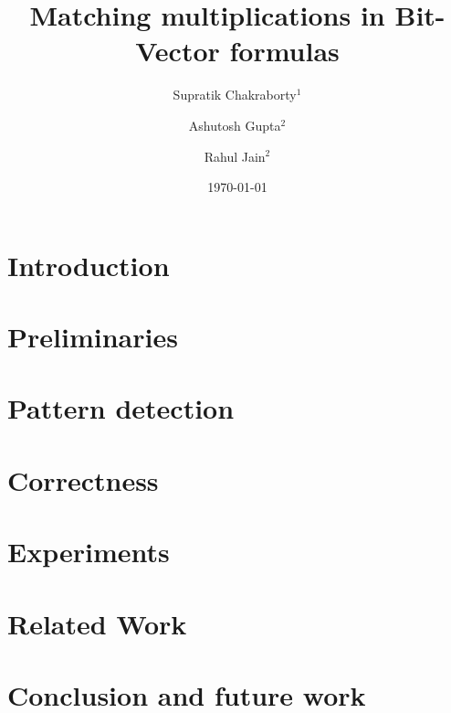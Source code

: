 \documentclass[draft]{llncs}
\begin{document}
\title{Matching multiplications in Bit-Vector formulas}

\author{Supratik Chakraborty$^1$ \and Ashutosh Gupta$^2$ \and Rahul Jain$^2$}


\date{\today}

\maketitle
\begin{abstract}

\end{abstract}

\section{Introduction}
\label{sec:intro}


\section{Preliminaries}
\label{sec:prelim}


\section{Pattern detection}
\label{sec:pattern}


\section{Correctness}
\label{sec:correct}


\section{Experiments}
\label{sec:experiments}



\section{Related Work}
\label{sec:related}

\section{Conclusion and future work}
\label{sec:conclusion}




\end{document}
